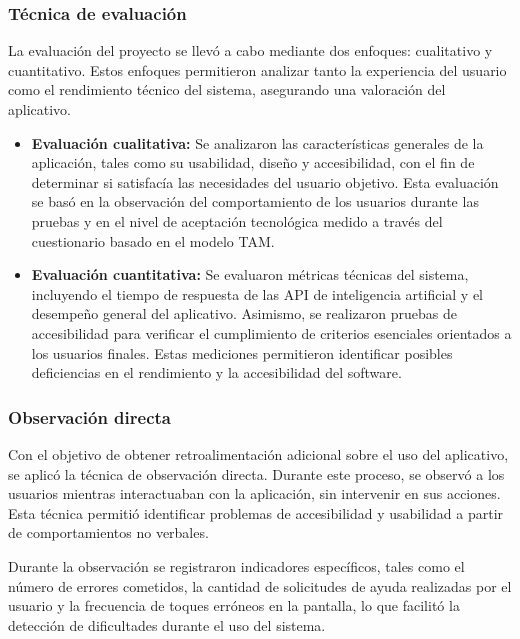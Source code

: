 \documentclass[lettersize,journal]{IEEEtran}
\begin{document}
        \subsubsection{Técnica de evaluación}
        
        La evaluación del proyecto se llevó a cabo mediante dos enfoques: cualitativo y cuantitativo. Estos enfoques permitieron analizar tanto la experiencia del usuario como el rendimiento técnico del sistema, asegurando una valoración del aplicativo.
        
        \begin{itemize}
        	\item \textbf{Evaluación cualitativa:} Se analizaron las características generales de la aplicación, tales como su usabilidad, diseño y accesibilidad, con el fin de determinar si satisfacía las necesidades del usuario objetivo. Esta evaluación se basó en la observación del comportamiento de los usuarios durante las pruebas y en el nivel de aceptación tecnológica medido a través del cuestionario basado en el modelo TAM.
        	
        	\item \textbf{Evaluación cuantitativa:} Se evaluaron métricas técnicas del sistema, incluyendo el tiempo de respuesta de las API de inteligencia artificial y el desempeño general del aplicativo. Asimismo, se realizaron pruebas de accesibilidad para verificar el cumplimiento de criterios esenciales orientados a los usuarios finales. Estas mediciones permitieron identificar posibles deficiencias en el rendimiento y la accesibilidad del software.
        \end{itemize}
        
        \subsubsection{Observación directa}
        
        Con el objetivo de obtener retroalimentación adicional sobre el uso del aplicativo, se aplicó la técnica de observación directa. Durante este proceso, se observó a los usuarios mientras interactuaban con la aplicación, sin intervenir en sus acciones. Esta técnica permitió identificar problemas de accesibilidad y usabilidad a partir de comportamientos no verbales.
        
        Durante la observación se registraron indicadores específicos, tales como el número de errores cometidos, la cantidad de solicitudes de ayuda realizadas por el usuario y la frecuencia de toques erróneos en la pantalla, lo que facilitó la detección de dificultades durante el uso del sistema.
        
\end{document}
